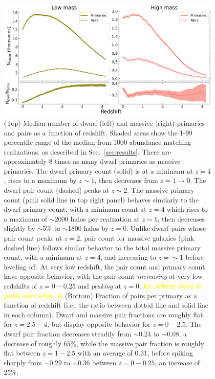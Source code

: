 \documentclass[twocolumn]{aastex631}
\newcommand{\kc}[1]{\textcolor{yellow}{\textbf{kc: #1}} }
\begin{document}
\begin{figure}[htb]
    \centering
    \includegraphics[width=\textwidth]{counts_1000.png}
    \caption{(Top) Median number of dwarf (left) and massive (right) primaries and pairs as a function of redshift.
    Shaded areas show the 1-99 percentile range of the median from 1000 abundance matching realizations, as described in Sec.~\ref{sec:results}.
    There are approximately 8 times as many dwarf primaries as massive primaries. 
    The dwarf primary count (solid) is at a minimum at $z=4$, rises to a maximum by $z\sim1$, then decreases from $z=1\to0$. 
    The dwarf pair count (dashed) peaks at $z\sim2$.
    The massive primary count (pink solid line in top right panel) behaves similarly to the dwarf primary count, with a minimum count at $z=4$ which rises to a maximum of $\sim2000$ halos per realization at $z\sim1$, then decreases slightly by $\sim5\%$ to $\sim$1800 halos by $z=0$. 
    Unlike dwarf pairs whose pair count peaks at $z=2$, pair count for massive galaxies (pink dashed line) follows similar behavior to the total massive primary count, with a minimum at $z=4$, and increasing to $z=\sim 1$ before leveling off. At very low redshift, the pair count and primary count have opposite behavior, with the pair count \textit{increasing} at very low redshifts of $z=0-0.25$ and \textit{peaking} at $z=0$.
    \kc{where does it peak and what is }
    (Bottom) Fraction of pairs per primary as a function of redshift (i.e., the ratio between dotted line and solid line in each column). Dwarf and massive pair fractions are roughly flat for $z=2.5-4$, but display opposite behavior for $z=0-2.5$. The dwarf pair fraction decreases steadily from $\sim0.24$ to $\sim0.08$, a decrease of roughly $65\%$, while the massive pair fraction is roughly flat between $z=1-2.5$ with an average of $0.31$, before spiking sharply from $\sim 0.29$ to $\sim 0.36$ between $z=0-0.25$, an increase of $25\%$.}
    \label{fig:counts}
\end{figure}
\end{document}
